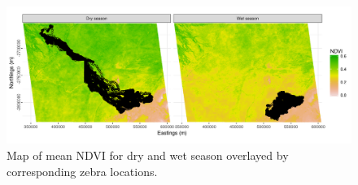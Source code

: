 \documentclass[12pt,a4paper, twoside, english]{article}
\begin{document}




\begin{figure}[H]
  \centering
  \includegraphics[width=\textwidth]{figures/Zebra_BWA_Dry_vs_Wet.png}
  \caption[Seasonal zebra locations and mean NDVI, Ngamiland]{Map of mean NDVI for dry and wet season overlayed by corresponding zebra locations.}
  \label{fig:zebra_season_bwa}
\end{figure}
\end{document}
